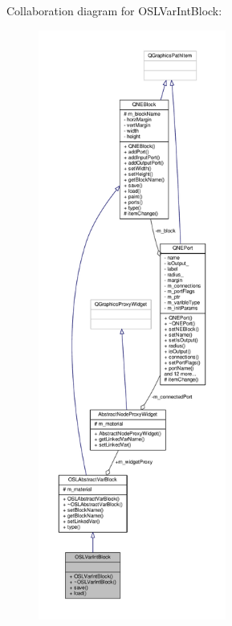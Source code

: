 Collaboration diagram for O\-S\-L\-Var\-Int\-Block\-:
\nopagebreak
\begin{figure}[H]
\begin{center}
\leavevmode
\includegraphics[height=550pt]{class_o_s_l_var_int_block__coll__graph}
\end{center}
\end{figure}
